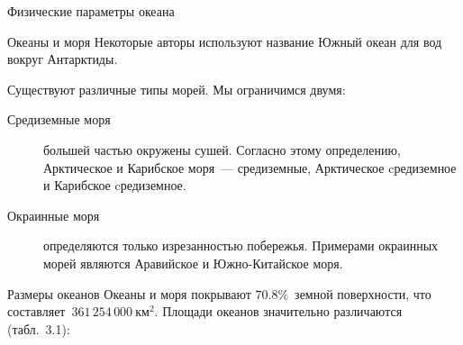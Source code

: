 \begin{chapter}{Физические параметры океана}
\begin{section}{Океаны и моря}
Некоторые авторы используют название Южный океан для вод вокруг Антарктиды.%

Существуют различные типы морей. Мы ограничимся двумя:
\begin{description}
\item[Средиземные моря] большей частью окружены сушей. Согласно этому
определению, Арктическое и Карибское моря~--- средиземные, Арктическое
cредиземное и Карибское cредиземное.
%

\item[Окраинные моря] определяются только изрезанностью побережья.
Примерами окраинных морей являются Аравийское и Южно-Китайское моря.
%
\end{description}
\end{section}


\begin{section}{Размеры океанов}
Океаны и моря покрывают $70.8\%$~земной поверхности, что 
составляет~$361\,254\,000~\mbox{км}^2$. Площади океанов значительно 
различаются (табл.~3.1):
%


\end{section}
\end{chapter}
